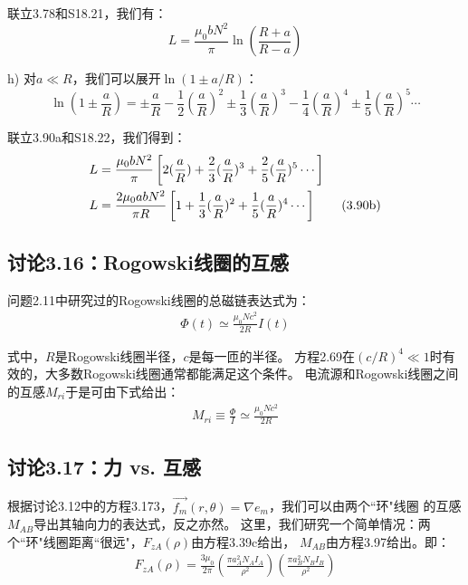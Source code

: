 联立3.78和S18.21，我们有：
 \begin{equation*}%
L=\frac{\mu_0bN^2}{\pi}\ln\left(\frac{R+a}{R-a}\right) \tag{3.90a}
\end{equation*}

h) 对$a\ll R$，我们可以展开$\ln(1\pm a/R)$：
 \begin{equation*}%
\ln(1\pm\frac{a}{R})=\pm\frac{a}{R}-\frac{1}{2}(\frac{a}{R})^2\pm\frac{1}{3}(\frac{a}{R})^3-\frac{1}{4}(\frac{a}{R})^4\pm\frac{1}{5}(\frac{a}{R})^5\cdots \tag{S18.22}
\end{equation*}

联立3.90a和S18.22，我们得到：
 \begin{align*}%
L&=\frac{\mu_0bN^2}{\pi}\left[2(\frac{a}{R})+\frac{2}{3}(\frac{a}{R})^3+\frac{2}{5}(\frac{a}{R})^5\cdots\right]\notag\\
L&=\frac{2\mu_0abN^2}{\pi R}\left[1+\frac{1}{3}(\frac{a}{R})^2+\frac{1}{5}(\frac{a}{R})^4\cdots\right]\tag{3.90b}
\end{align*}




\subsection{讨论3.16：Rogowski线圈的互感}
问题2.11中研究过的Rogowski线圈的总磁链表达式为：
 \begin{align*}%
\Phi(t)\simeq\frac{\mu_0Nc^2}{2R}I(t) \tag{2.69}
\end{align*}

式中，$R$是Rogowski线圈半径，$c$是每一匝的半径。
方程2.69在$(c/R)^4\ll 1$时有效的，大多数Rogowski线圈通常都能满足这个条件。
电流源和Rogowski线圈之间的互感$M_{ri}$于是可由下式给出：
\begin{align}%
M_{ri}\equiv\frac{\Phi}{I}\simeq\frac{\mu_0Nc^2}{2R}
\end{align}



\subsection{讨论3.17：力 vs. 互感}
根据讨论3.12中的方程3.173，$\vec{f_m}(r,\theta)=\nabla e_m$，我们可以由两个``环"线圈
的互感$M_{AB}$导出其轴向力的表达式，反之亦然。
这里，我们研究一个简单情况：两个``环"线圈距离``很远"，$F_{zA}(\rho)$由方程3.39c给出，
$M_{AB}$由方程3.97给出。即：
 \begin{align*}%
F_{zA}(\rho)=\frac{3\mu_0}{2\pi}\left(\frac{\pi a_{A}^{2}N_AI_A}{\rho^2}\right)\left(\frac{\pi a_{B}^{2}N_BI_B}{\rho^2}\right) \tag{3.39c}
\end{align*}

